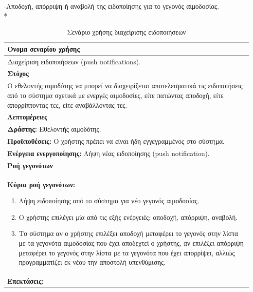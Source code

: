 -Αποδοχή, απόρριψη ή αναβολή της ειδοποίησης για το γεγονός αιμοδοσίας.
\\*
\begin{table}[H]
	\begin{center}
	    \begin{tabular}{|p{\dimexpr \linewidth-2\tabcolsep}|}
	    \hline
	    \rowcolor{grayy}
	    \textbf{Όνομα σεναρίου χρήσης}
	    \\ \hline    
	     Διαχείριση ειδοποιήσεων (push notifications).
	     \\ \hline
	    \rowcolor{grayy}
	    \textbf{\textbf{Στόχος}}
	    \\ \hline
	 	 Ο εθελοντής αιμοδότης να μπορεί να διαχειρίζεται αποτελεσματικά τις ειδοποιήσεις από το σύστημα σχετικά με ενεργές αιμοδοσίες, είτε πατώντας αποδοχή,  είτε απορρίπτοντας τες, είτε αναβάλλοντας τες.
	    \\ \hline
	    \rowcolor{grayy}
	    \textbf{Λεπτομέρειες}
	    \\ \hline
		\textbf{Δράστης:} Εθελοντής αιμοδότης.
		\\*
		\textbf{Προϋποθέσεις:} Ο χρήστης πρέπει να είναι ήδη εγγεγραμμένος στο σύστημα.
		\\*
		\textbf{Ενέργεια ενεργοποίησης:} Λήψη νέας ειδοποίησης (push notification).
		\\ \hline
		\rowcolor{grayy}    
	    \textbf{Ροή γεγονότων}
	    \\ \hline
		\textbf{Κύρια ροή γεγονότων:}
		\begin{enumerate}
		
			\item	Λήψη ειδοποίησης από το σύστημα για νέο γεγονός αιμοδοσίας.
			\item  Ο χρήστης επιλέγει μία από τις εξής ενέργειές: αποδοχή, απόρριψη, αναβολή.
			\item Το σύστημα αν ο χρήστης επιλέξει αποδοχή μεταφέρει το γεγονός στην λίστα με τα γεγονότα αιμοδοσίας που έχει αποδεχτεί ο χρήστης, αν επιλέξει απόρριψη μεταφέρει το γεγονός στην λίστα με τα γεγονότα που έχει απορρίψει, αλλιώς προγραμματίζει εκ νέου την αποστολή υπενθύμισης.

		\end{enumerate}
		\\ \hline
		\textbf{Επεκτάσεις:}
		   \\ \hline
	    \end{tabular}
	    \caption{Σενάριο χρήσης διαχείρισης ειδοποιήσεων}
	    \label{tab:manage_notifcations} 
	\end{center}		
\end{table}			
			

